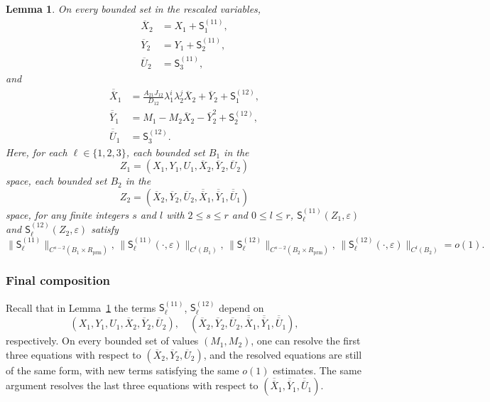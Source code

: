 \documentclass[11pt,a4paper]{article}
\theoremstyle{plain}
\newtheorem{lemma}[theorem]{Lemma}
\theoremstyle{definition}
\theoremstyle{plain}
\numberwithin{equation}{section}
\begin{document}
\begin{lemma}
\label{lem-rescaled-LG}
On every bounded set in the rescaled variables,
\begin{align*}
\overline{X}_2 &= X_1 + \mathsf{S}_1^{(11)}, \\
\overline{Y}_2 &= Y_1 + \mathsf{S}_2^{(11)}, \\
\overline{U}_2 &= \mathsf{S}_3^{(11)},
\end{align*}
and
\begin{align*}
\overline{\overline{X}}_1
&=
\frac{A_{21}J_{12}}{D_{12}}\lambda_1^i\lambda_2^j\overline{X}_2
+
\overline{Y}_2
+
\mathsf{S}_1^{(12)},
\\
\overline{\overline{Y}}_1
&=
M_1
-
M_2 \overline{X}_2
-
\overline{Y}_2^2
+
\mathsf{S}_2^{(12)},
\\
\overline{\overline{U}}_1
&=
\mathsf{S}_3^{(12)}.
\end{align*}
Here, for each $\ell \in \{1,2,3\}$, each bounded set $B_1$ in the
\[
Z_1 = (X_1, Y_1, U_1, \overline{X}_2, \overline{Y}_2, \overline{U}_2)
\]
space, each bounded set $B_2$ in the
\[
Z_2 = (\overline{X}_2, \overline{Y}_2, \overline{U}_2,\overline{\overline{X}}_1, \overline{\overline{Y}}_1, \overline{\overline{U}}_1)
\]
space, for any finite integers $s$ and $l$ with $2 \le s \le r$ and $0 \le l \le r$, $\mathsf{S}_\ell^{(11)}(Z_1, \varepsilon)$ and $\mathsf{S}_\ell^{(12)}(Z_2, \varepsilon)$ satisfy
\[
\|\mathsf{S}_\ell^{(11)}\|_{C^{s-2}(B_1 \times R_\mathrm{prm})}, \, \|\mathsf{S}_\ell^{(11)}(\cdot, \varepsilon)\|_{C^l(B_1)}, \, \|\mathsf{S}_\ell^{(12)}\|_{C^{s-2}(B_2 \times R_\mathrm{prm})}, \, \|\mathsf{S}_\ell^{(12)}(\cdot, \varepsilon)\|_{C^l(B_2)} = o(1).
\]
\end{lemma}

\subsubsection{Final composition}

Recall that in Lemma~\ref{lem-rescaled-LG} the terms $\mathsf{S}_\ell^{(11)}$, $\mathsf{S}_\ell^{(12)}$ depend on
\[
(X_1, Y_1, U_1, \overline{X}_2, \overline{Y}_2, \overline{U}_2), \quad (\overline{X}_2, \overline{Y}_2, \overline{U}_2,\overline{\overline{X}}_1, \overline{\overline{Y}}_1, \overline{\overline{U}}_1),
\]
respectively. On every bounded set of values $(M_1, M_2)$, one can resolve the first three equations with respect to $(\overline{X}_2, \overline{Y}_2, \overline{U}_2)$, and the resolved equations are still of the same form, with new terms satisfying the same $o(1)$ estimates. The same argument resolves the last three equations with respect to $(\overline{\overline{X}}_1, \overline{\overline{Y}}_1, \overline{\overline{U}}_1)$.
\end{document}
